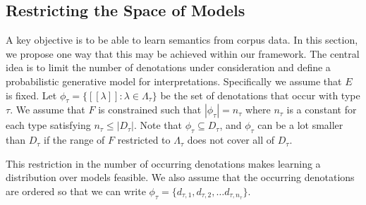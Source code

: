 \documentclass[11pt]{article}
\theoremstyle{definition}
\newcommand{\interp}[1]{[\![ #1 ]\!]}
\begin{document}


 
\subsection{Restricting the Space of Models}
\label{section:distributions}

A key objective is to be able to learn semantics from corpus data.  In
this section, we propose one way that this may be achieved within our
framework. The central idea is to limit the number of denotations
under consideration and define a probabilistic generative model for
interpretations. Specifically we assume that $E$ is fixed. Let
$\phi_\tau = \{\interp{\lambda} : \lambda\in \Lambda_\tau\}$ be the
set of denotations that occur with type $\tau$. We assume that $F$ is
constrained such that $|\phi_\tau| = n_\tau$ where $n_\tau$ is a
constant for each type satisfying $n_\tau \le |D_\tau|$. Note that
$\phi_\tau \subseteq D_\tau$, and $\phi_\tau$ can be a lot smaller
than $D_\tau$ if the range of $F$ restricted to $\Lambda_\tau$ does
not cover all of $D_\tau$.

This restriction in the number of occurring denotations makes learning
a distribution over models feasible. We also assume that the occurring
denotations are ordered so that we can write $\phi_\tau =
\{d_{\tau,1}, d_{\tau,2}, \ldots d_{\tau, n_\tau}\}$.
\end{document}
